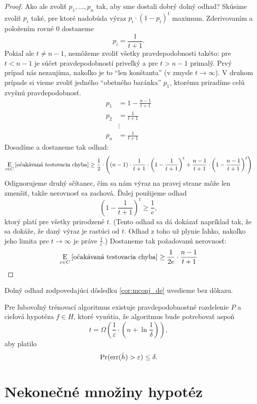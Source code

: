 \begin{proof}
  Ako ale zvoliť $p_1, \ldots, p_n$ tak, aby sme dostali dobrý dolný
  odhad? Skúsime zvoliť $p_i$ také, pre ktoré nadobúda výraz
  $p_i \cdot (1 - p_i)^t$ maximum. Zderivovaním a položením rovné
  $0$ dostaneme
  $$p_i = \frac{1}{t+1}.$$
  Pokiaľ ale $t \neq n - 1$, nemôžeme zvoliť všetky pravdepodobnosti
  takéto: pre $t < n - 1$ je súčet pravdepodobností priveľký a pre $t > n - 1$
  primalý. Prvý prípad nás nezaujíma, nakoľko je to ``len konštanta''
  (v zmysle $t \to \infty$). V druhom prípade si vieme zvoliť jedného
  ``obetného baránka'' $p_1$, ktorému priradíme celú zvyšnú
  pravdepodobnosť.
  \begin{align}
    p_1 &= 1 - \frac{n-1}{t+1} \\
    p_2 &= \frac{1}{t+1} \\
        &\vdots \\
    p_n &= \frac{1}{t+1}
  \end{align}
  Dosadíme a dostaneme tak odhad:
  $$ \E_{c \in C} \left[ \chalg \right] \geq \frac{1}{2} \cdot \left( (n - 1) \cdot \frac{1}{t+1} \cdot \left( 1 - \frac{1}{t+1} \right)^t + \frac{n-1}{t+1} \cdot \left( 1 - \frac{n-1}{t+1} \right)^t   \right) $$
  Odignorujeme druhý sčítanec, čím sa nám výraz na pravej strane môže
  len zmenšiť, takže nerovnosť sa zachová. Ďalej použijeme odhad
  $$ \left( 1 - \frac{1}{t+1} \right)^t \geq \frac{1}{e}, $$
  ktorý platí pre všetky prirodzené $t$. (Tento odhad sa dá dokázať
  napríklad tak, že sa dokáže, že daný výraz je rastúci od $t$. Odhad
  z toho už plynie ľahko, nakoľko jeho limita pre $t \to \infty$ je
  práve $\frac{1}{e}$.) Dostaneme tak požadovanú nerovnosť:
  $$ \E_{c \in C} \left[ \chalg \right] \geq \frac{1}{2e} \cdot \frac{n-1}{t+1} $$
\end{proof}

Dolný odhad zodpovedajúci dôsledku \ref{cor:mconj_de} uvedieme bez dôkazu.

\begin{theorem}
  Pre ľubovoľný trénovací algoritmus existuje pravdepodobnostné rozdelenie
  $P$ a cieľová hypotéza $f \in H$, ktoré vynútia, že algoritmus bude
  potrebovať aspoň
  $$ t = \Omega \left( \frac{1}{\varepsilon} \cdot \left( n + \ln{\frac{1}{\delta}} \right) \right), $$
  aby platilo
  $$ \prob(\err(\hat{h}) > \varepsilon) \leq \delta.$$
\end{theorem}





\section{Nekonečné množiny hypotéz}

